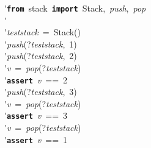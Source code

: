 \'\>\texttt{\textbf{from}}~stack~\texttt{\textbf{import}}~Stack,~\textit{push},~\textit{pop}\\

\'\>\\

\'\>\textit{teststack}~=~Stack()\\

\'\>\textit{push}(?\textit{teststack},~1)\\

\'\>\textit{push}(?\textit{teststack},~2)\\

\'\>\textit{v}~=~\textit{pop}(?\textit{teststack})\\

\'\>\texttt{\textbf{assert}}~\textit{v}~==~2\\

\'\>\textit{push}(?\textit{teststack},~3)\\

\'\>\textit{v}~=~\textit{pop}(?\textit{teststack})\\

\'\>\texttt{\textbf{assert}}~\textit{v}~==~3\\

\'\>\textit{v}~=~\textit{pop}(?\textit{teststack})\\

\'\>\texttt{\textbf{assert}}~\textit{v}~==~1